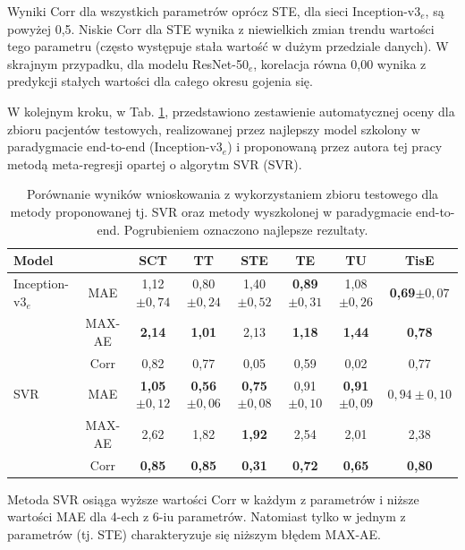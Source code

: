 Wyniki Corr dla wszystkich parametrów oprócz STE, dla sieci Inception-v3$_{e}$, są powyżej 0,5. Niskie Corr dla STE wynika z niewielkich zmian trendu wartości tego parametru (często występuje stała wartość w dużym przedziale danych). W skrajnym przypadku, dla modelu ResNet-50$_{e}$, korelacja równa 0,00 wynika z predykcji stałych wartości dla całego okresu gojenia się.

W kolejnym kroku, w Tab. \ref{tab:end-to-end_testset}, przedstawiono zestawienie automatycznej oceny dla zbioru pacjentów testowych, realizowanej przez najlepszy model szkolony w paradygmacie end-to-end (Inception-v3$_e$) i proponowaną przez autora tej pracy metodą meta-regresji opartej o algorytm SVR (SVR).  
\renewcommand{\arraystretch}{1.2}
\begin{table}[t]
	\caption{Porównanie wyników wnioskowania z wykorzystaniem zbioru testowego dla metody proponowanej tj. SVR oraz metody wyszkolonej w paradygmacie end-to-end. Pogrubieniem oznaczono najlepsze rezultaty.}
	\scriptsize
	\begin{center}
		\begin{tabular}{lc||c|c|c|c|c|c}
			\textbf{Model} & & \textbf{SCT} & \textbf{TT} & \textbf{STE} & \textbf{TE} & \textbf{TU} & \textbf{TisE}\\ \hline \hline
			Inception-v3$_{e}$ & MAE & 1,12$\pm{0,74}$ & 0,80$\pm{0,24}$ & 1,40$\pm{0,52}$ & \textbf{0,89}$\pm{0,31}$ & 1,08$\pm{0,26}$ & \textbf{0,69}$\pm{0,07}$ \\
			& MAX-AE & \textbf{2,14} & \textbf{1,01} & 2,13 & \textbf{1,18} & \textbf{1,44} & \textbf{0,78} \\
			& Corr & 0,82 & 0,77 & 0,05 & 0,59 & 0,02 & 0,77 \\ \hline
			SVR & MAE & \textbf{1,05}$\pm0,12$ & \textbf{0,56}$\pm0,06$ & \textbf{0,75}$\pm0,08$ & 0,91$\pm0,10$ & \textbf{0,91}$\pm0,09$ & $0,94\pm0,10$\\
			& MAX-AE & 2,62 & 1,82 & \textbf{1,92} & 2,54 & 2,01 & 2,38 \\
			& Corr & \textbf{0,85} & \textbf{0,85} & \textbf{0,31} & \textbf{0,72} & \textbf{0,65} & \textbf{0,80} 
		\end{tabular}
	\end{center}
	\label{tab:end-to-end_testset}
\end{table}
\renewcommand{\arraystretch}{1}

Metoda SVR osiąga wyższe wartości Corr w każdym z parametrów i niższe wartości MAE dla 4-ech z 6-iu parametrów. Natomiast tylko w jednym z parametrów (tj. STE) charakteryzuje się niższym błędem MAX-AE. 

